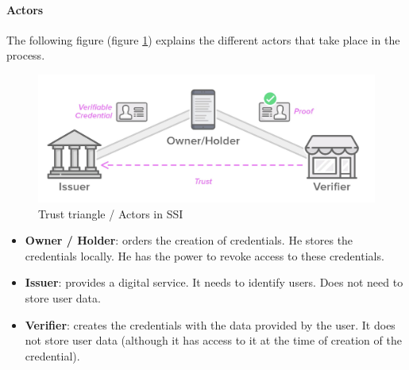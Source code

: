 \documentclass[a4paper, 12pt]{article} %
\begin{document}
                \paragraph{Actors}
                    The following figure (figure \ref{fig:trust-triangle}) explains the different actors\cite{ssi-guide} that take place in the process.
                    \begin{figure}[h]
                        \centering
                        \includegraphics[width=1.0\textwidth]{trust-triangle.png}
                        \caption{Trust triangle / Actors in SSI}
                        \label{fig:trust-triangle}
                    \end{figure}
                    \begin{itemize}
                        \item \textbf{Owner / Holder}: orders the creation of credentials. He stores the credentials locally. He has the power to revoke access to these credentials.
                        \item \textbf{Issuer}: provides a digital service. It needs to identify users. Does not need to store user data.
                        \item \textbf{Verifier}: creates the credentials with the data provided by the user. It does not store user data (although it has access to it at the time of creation of the credential).
                    \end{itemize}
            
\end{document}
